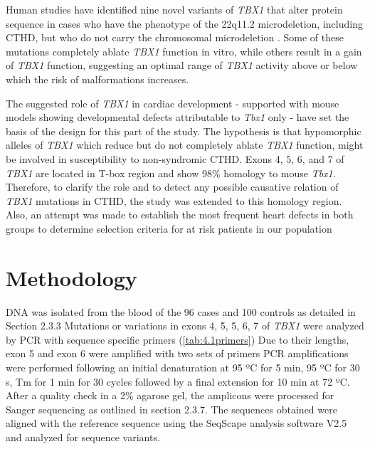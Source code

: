 \begin{refsection}
Human studies have identified nine novel variants of \textit{TBX1} that alter protein sequence in cases who have the phenotype of the 22q11.2 microdeletion, including CTHD, but who do not carry the chromosomal microdeletion \cite{gong2001mutation, lindsay2001tbx1}. Some of these mutations completely ablate \textit{TBX1} function in vitro, while others result in a gain of \textit{TBX1} function, suggesting an optimal range of \textit{TBX1} activity above or below which the risk of malformations increases. 

The suggested role of \textit{TBX1} in cardiac development - supported with mouse models showing developmental defects attributable to \textit{Tbx1} only - have set the basis of the design for this part of the study. The hypothesis is that hypomorphic alleles of \textit{TBX1} which reduce but do not completely ablate \textit{TBX1} function, might be involved in susceptibility to non-syndromic CTHD. Exons 4, 5, 6, and 7 of \textit{TBX1} are located in T-box region and show 98\% homology to mouse \textit{Tbx1}. Therefore, to clarify the role and to detect any possible causative relation of \textit{TBX1} mutations in CTHD, the study was extended to this homology region. Also, an attempt was made to establish the most frequent heart defects in both groups to determine selection criteria for at risk patients in our population

\section{Methodology}
DNA was isolated from the blood of the 96 cases and 100 controls as detailed in Section 2.3.3 Mutations or variations in exons 4, 5, 5, 6, 7 of \textit{TBX1} were analyzed by PCR with sequence specific primers (\cref{tab:4.1primers}) Due to their lengths, exon 5 and exon 6 were amplified  with two sets of primers PCR amplifications were performed following an initial denaturation at 95 ºC for 5 min, 95 ºC  for  30 s, Tm for 1 min for 30 cycles  followed by a final extension for 10 min at 72 ºC. After a quality check in a 2\% agarose gel, the amplicons were processed for Sanger sequencing as outlined in section 2.3.7. The sequences obtained were aligned with the reference sequence using the SeqScape analysis software V2.5 and analyzed for sequence variants.


\end{refsection}

